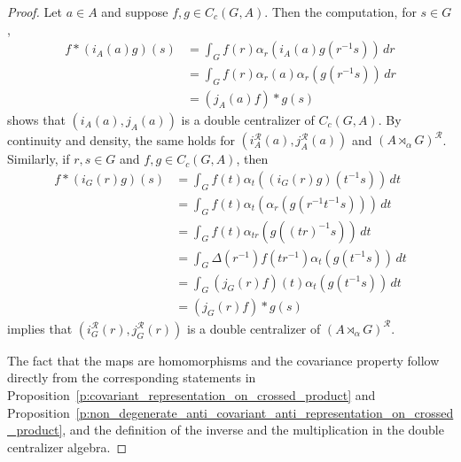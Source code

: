 \documentclass{amsart}
\theoremstyle{plain}
\theoremstyle{definition}
\numberwithin{equation}{section}
\begin{document}
\begin{proof}
Let $a\in A$ and suppose $f,g \in C_c(G,A)$. Then the computation, for $s\in G$,
\begin{align*}
 f * (i_A(a)g) (s) &= \int_G f(r) \alpha_r(i_A(a)g(r^{-1}s)) \, dr \\
&= \int_G f(r) \alpha_r(a) \alpha_r(g(r^{-1}s)) \,dr \\
&= (j_A(a)f) * g (s)
\end{align*}
shows that $(i_A(a), j_A(a))$ is a double centralizer of $C_c(G,A)$. By continuity and density, the same holds for $(i_A^{\mathcal R}(a), j_A^{\mathcal R}(a))$ and ${(A {\rtimes}_\alpha G)^\mathcal{R}}$. Similarly, if $r,s\in G$ and $f,g\in C_c(G,A)$, then
\begin{align*}
 f * (i_G(r)g) (s) &= \int_G f(t) \alpha_t((i_G(r)g)(t^{-1}s)) \, dt \\
&= \int_G f(t) \alpha_t ( \alpha_r(g(r^{-1}t^{-1}s))) \,dt \\
&= \int_G f(t) \alpha_{tr}( g((tr)^{-1}s)) \, dt \\
&= \int_G \Delta(r^{-1}) f(tr^{-1}) \alpha_t ( g(t^{-1}s)) \, dt \\
&= \int_G (j_G(r)f) (t) \alpha_t(g(t^{-1}s)) \, dt\\
&= (j_G(r)f) * g (s)
\end{align*}
implies that $(i_G^{\mathcal R}(r), j_G^{\mathcal R}(r))$ is a double centralizer of ${(A {\rtimes}_\alpha G)^\mathcal{R}}$.

The fact that the maps are homomorphisms and the covariance property follow directly from the corresponding statements in Proposition~\ref{p:covariant_representation_on_crossed_product} and Proposition~\ref{p:non_degenerate_anti_covariant_anti_representation_on_crossed_product}, and the definition of the inverse and the multiplication in the double centralizer algebra.


\end{proof}
\end{document}
